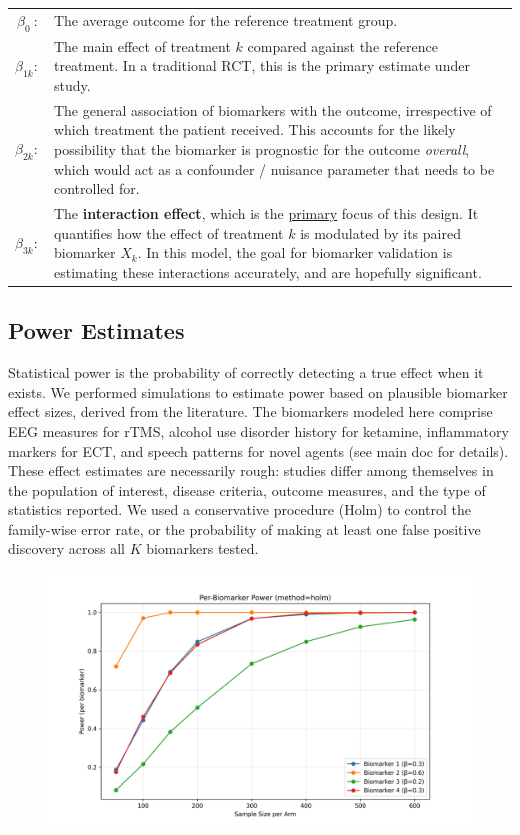 \documentclass[11pt]{article}
\begin{document}
\medskip
\medskip
\noindent
\begin{tabular}{@{} r p{} @{}}
  \(\beta_0\ :\) & The average outcome for the reference treatment group. \\
  \(\beta_{1k}:\) & The main effect of treatment \(k\) compared against the reference treatment. In a traditional RCT, this is the primary estimate under study. \\
  \(\beta_{2k}:\) & The general association of biomarkers with the outcome, irrespective of which treatment the patient received. This accounts for the likely possibility that the biomarker is prognostic for the outcome {\it overall}, which would act as a confounder / nuisance parameter that needs to be controlled for. \\
  \(\beta_{3k}:\) & The \textbf{interaction effect}, which is the \underline{primary} focus of this design. It quantifies how the effect of treatment \(k\) is modulated by its paired biomarker \(X_k\). In this model, the goal for biomarker validation is estimating these interactions accurately, and are hopefully significant. \\
\end{tabular}
\medskip

\subsection*{Power Estimates}

Statistical power is the probability of correctly detecting a true effect when it exists. We performed simulations to estimate power based on plausible biomarker effect sizes, derived from the literature. The biomarkers modeled here comprise EEG measures for rTMS, alcohol use disorder history for ketamine, inflammatory markers for ECT, and speech patterns for novel agents (see main doc for details). These effect estimates are necessarily rough: studies differ among themselves in the population of interest, disease criteria, outcome measures, and the type of statistics reported. We used a conservative procedure (Holm) to control the family-wise error rate, or the probability of making at least one false positive discovery across all \(K\) biomarkers tested.

\begin{figure}[ht!]
\centering
\includegraphics[width=1.0\textwidth]{figs/biomarker_power_holm.png}
\end{figure}
\end{document}
